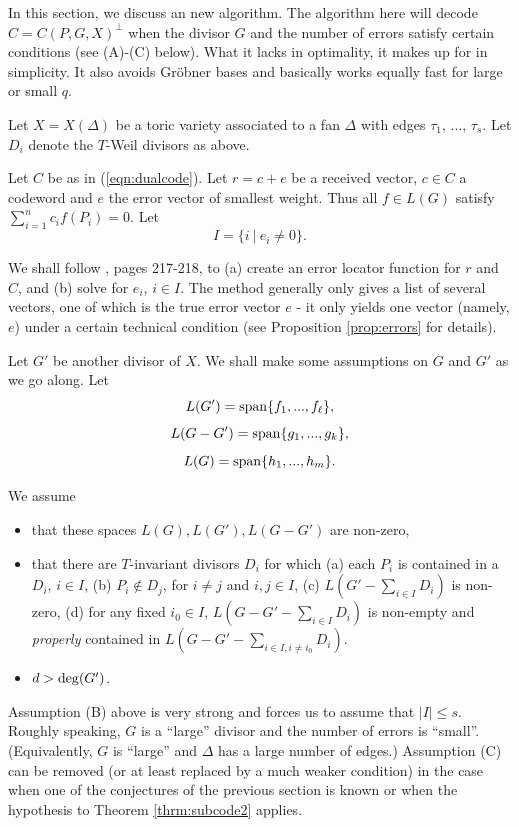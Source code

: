 \documentclass[12pt]{article}
\begin{document}
In this section, we discuss an new algorithm.
The algorithm here will decode $C=C(P,G,X)^\perp$ when
the divisor $G$ and the number of errors satisfy certain
conditions (see (A)-(C) below).
What it lacks in optimality, it makes up for in simplicity.
It also avoids Gr\"obner bases and basically works equally fast 
for large or small $q$.

Let $X=X(\Delta)$ be a toric variety associated to a fan $\Delta$
with edges $\tau_1$, ..., $\tau_s$. Let $D_i$ denote the $T$-Weil
divisors as above.

Let $C$ be as in (\ref{eqn:dualcode}).
Let $r=c+e$ be a received vector, $c\in C$ a codeword
and $e$ the error vector of smallest weight. Thus all
$f\in L(G)$ satisfy $\sum_{i=1}^n c_if(P_i)=0$. Let
\[
I=\{i\ |\ e_i\not= 0\}.
\]

We shall follow \cite{S}, pages 217-218, to (a) create an
error locator function for $r$ and $C$, and (b) solve for 
$e_i$, $i\in I$. The method generally only gives a list
of several vectors, one of which is the true error
vector $e$ - it only yields one vector (namely, $e$)
under a certain technical condition (see
Proposition \ref{prop:errors} for details).

Let $G'$ be another divisor of $X$. We shall make some
assumptions on $G$ and $G'$ as we go along. Let
\[
L(G')={\rm span}\{f_1,...,f_\ell\},
\]
\[
L(G-G')={\rm span}\{g_1,...,g_k\},
\]
\[
L(G)={\rm span}\{h_1,...,h_m\}.
\]

We assume 
\begin{itemize}
\item[(A)]
that these spaces $L(G),L(G'),L(G-G')$ are non-zero,
\item[(B)]
that there are $T$-invariant divisors $D_i$ for which 
(a) each $P_i$ is contained in a $D_i$, $i\in I$,
(b) $P_i\notin D_j$, for $i\not= j$ and $i,j\in I$,
(c) $L(G'-\sum_{i\in I}D_i)$ is non-zero,
(d) for any fixed $i_0\in I$,
$L(G-G'-\sum_{i\in I}D_i)$ is non-empty and {\it properly}
contained in 
$L(G-G'-\sum_{i\in I,i\not= i_0}D_i)$.
\item[(C)]
$d> {\rm deg}(G')$.

\end{itemize}
Assumption (B) above is very strong and forces us
to assume that $|I|\leq s$. Roughly speaking, $G$ is a ``large'' 
divisor and the number of errors is ``small''.
(Equivalently, $G$ is ``large'' and $\Delta$ has a large number of
edges.) Assumption (C) can be removed (or at least replaced by a
much weaker condition) in the case when one of the conjectures
of the previous section is known or when the hypothesis to
Theorem \ref{thrm:subcode2} applies. 
\end{document}
